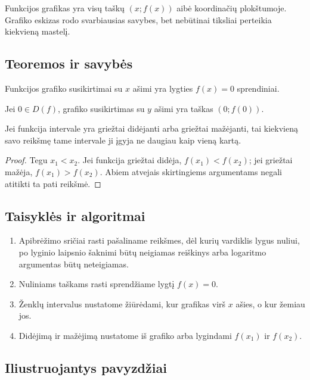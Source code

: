 \begin{apibreztis}
Funkcijos grafikas yra visų taškų $(x;f(x))$ aibė koordinačių plokštumoje. Grafiko eskizas rodo svarbiausias savybes, bet nebūtinai tiksliai perteikia kiekvieną mastelį.
\end{apibreztis}

\subsection{Teoremos ir savybės}

\begin{savybe}
Funkcijos grafiko susikirtimai su $x$ ašimi yra lygties $f(x)=0$ sprendiniai.
\end{savybe}

\begin{savybe}
Jei $0\in D(f)$, grafiko susikirtimas su $y$ ašimi yra taškas $(0;f(0))$.
\end{savybe}

\begin{teorema}
Jei funkcija intervale yra griežtai didėjanti arba griežtai mažėjanti, tai kiekvieną savo reikšmę tame intervale ji įgyja ne daugiau kaip vieną kartą.
\end{teorema}
\begin{proof}
Tegu $x_1<x_2$. Jei funkcija griežtai didėja, $f(x_1)<f(x_2)$; jei griežtai mažėja, $f(x_1)>f(x_2)$. Abiem atvejais skirtingiems argumentams negali atitikti ta pati reikšmė.
\end{proof}

\subsection{Taisyklės ir algoritmai}

\begin{enumerate}
\item Apibrėžimo sričiai rasti pašaliname reikšmes, dėl kurių vardiklis lygus nuliui, po lyginio laipsnio šaknimi būtų neigiamas reiškinys arba logaritmo argumentas būtų neteigiamas.
\item Nuliniams taškams rasti sprendžiame lygtį $f(x)=0$.
\item Ženklų intervalus nustatome žiūrėdami, kur grafikas virš $x$ ašies, o kur žemiau jos.
\item Didėjimą ir mažėjimą nustatome iš grafiko arba lygindami $f(x_1)$ ir $f(x_2)$.
\end{enumerate}

\subsection{Iliustruojantys pavyzdžiai}

